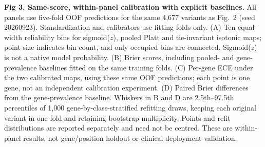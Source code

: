 \caption{{\bf Fig 3. Same-score, within-panel calibration with explicit baselines.} All panels use five-fold OOF predictions for the same 4,677 variants as Fig.~2 (seed 20260923). Standardization and calibrators use fitting folds only. (A) Ten equal-width reliability bins for sigmoid($z$), pooled Platt and tie-invariant isotonic maps; point size indicates bin count, and only occupied bins are connected. Sigmoid($z$) is not a native model probability. (B) Brier scores, including pooled- and gene-prevalence baselines fitted on the same training folds. (C) Per-gene ECE under the two calibrated maps, using these same OOF predictions; each point is one gene, not an independent calibration experiment. (D) Paired Brier differences from the gene-prevalence baseline. Whiskers in B and D are 2.5th--97.5th percentiles of 1,000 gene-by-class-stratified refitting draws, keeping each original variant in one fold and retaining bootstrap multiplicity. Points and refit distributions are reported separately and need not be centred. These are within-panel results, not gene/position holdout or clinical deployment validation.}
